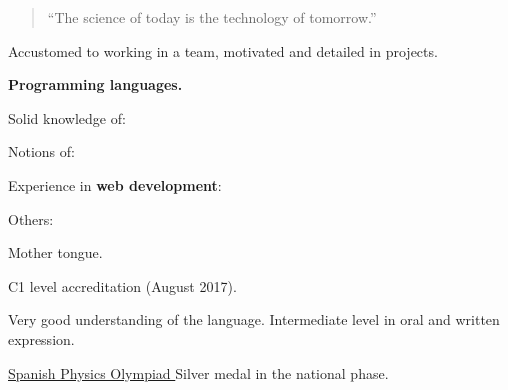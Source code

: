

\begin{quote}
  ``The science of today is the technology of tomorrow.''
\end{quote}


Accustomed to working in a team, motivated and detailed in projects.

\divider

\textbf{Programming languages.} \\ \medskip

Solid knowledge of:

\begin{center}
\end{center}

Notions of: \quad
{}

\divider

Experience in \textbf{web development}:
\vspace{-.05cm}
\begin{center}
\end{center}
\vspace{-.25cm}

\divider

Others: \quad
{}
\cvtag{\LaTeX}

\medskip



\smallskip
Mother tongue.
\vspace{-.35cm}
\divider

\smallskip
C1 level accreditation (August 2017).
\vspace{-.35cm}
\divider

\smallskip
Very good understanding of the language. Intermediate level in oral and written
expression.

\medskip



\cvachievement{\faTrophy}
{\href{https://rsef.es/olimpiada-espanola-de-fisica}
  {Spanish Physics Olympiad \smallskip}}
{\small{}%
  \small{}}
Silver medal in the national phase.

